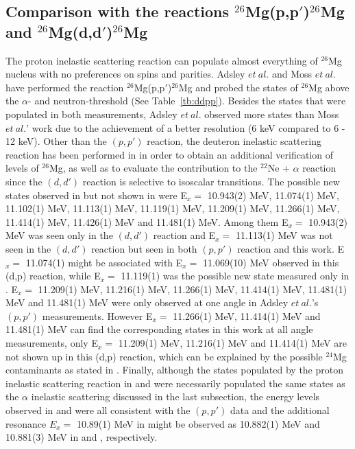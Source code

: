 \subsection{Comparison with the reactions $^{26}$Mg(p,p$'$)$^{26}$Mg and  $^{26}$Mg(d,d$'$)$^{26}$Mg}
The proton  inelastic scattering reaction can populate almost everything of $^{26}$Mg nucleus with no preferences on spins and parities. Adsley $et\ al.$\citep{26mgdd2018} and Moss $et\ al.$ \citep{Moss1967} have performed the reaction $^{26}$Mg(p,p$'$)$^{26}$Mg and probed the states of $^{26}$Mg above the $\alpha$- and neutron-threshold (See Table~\ref{tb:ddpp}).
Besides the states that were populated in both measurements, Adsley $et\ al.$ observed more states than  Moss $et\ al.$' work due to the achievement of a better resolution (6 keV compared to 6 - 12 keV).
Other than the $(p,p')$ reaction, the deuteron inelastic scattering reaction has been performed in  \citep{26mgdd2018} in order to obtain an additional verification of levels of $^{26}$Mg, as well as to evaluate the contribution to the $^{22}$Ne + $\alpha$ reaction  since the $(d,d')$ reaction is selective to isoscalar transitions. The possible new states observed in \citep{26mgdd2018} but not shown in  \citep{Moss1967} were E$_x=$ 10.943(2) MeV, 11.074(1) MeV, 11.102(1) MeV, 11.113(1) MeV, 11.119(1) MeV, 11.209(1) MeV, 11.266(1) MeV, 11.414(1) MeV, 11.426(1) MeV and 11.481(1) MeV. Among them E$_x=$ 10.943(2) MeV was seen only in the  $(d,d')$ reaction and E$_x=$ 11.113(1) MeV was not seen in the  $(d,d')$ reaction but seen in both $(p,p')$ reaction and this work.  E$_x=$ 11.074(1) might be  associated with E$_x=$ 11.069(10) MeV observed in this (d,p) reaction, while E$_x=$ 11.119(1) was the possible new state measured only in \citep{26mgdd2018}.  E$_x=$ 11.209(1) MeV, 11.216(1) MeV, 11.266(1) MeV, 11.414(1) MeV, 11.481(1) MeV and 11.481(1) MeV were only observed at one angle in  Adsley $et\ al.$'s $(p,p')$ measurements. However E$_x=$ 11.266(1) MeV,  11.414(1) MeV and 11.481(1) MeV can find the corresponding states in this work at all angle measurements, only E$_x=$ 11.209(1) MeV, 11.216(1) MeV and 11.414(1) MeV are not shown up in this (d,p) reaction, which can be explained by the possible $^{24}$Mg contaminants as stated in \citep{26mgdd2018}. Finally, although the states populated by the proton inelastic scattering reaction in \citep{26mgdd2018} and \citep{Moss1967}  were necessarily populated the same states as the $\alpha$ inelastic scattering discussed in the last subsection, the energy levels observed in  \cite{Rashi2016} and \cite{26mgaa2017} were all  consistent with the $(p,p')$ data and the additional resonance $E_x=$ 10.89(1) MeV in \cite{26mgaa2017} might be observed as 10.882(1) MeV and 10.881(3) MeV in \citep{26mgdd2018} and \citep{Moss1967}, respectively.



